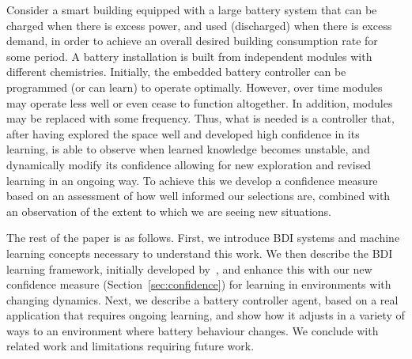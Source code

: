 Consider a smart building equipped with a large
battery system that can be charged when there is excess power, and
used (discharged) when there is excess demand, in order to
achieve an overall desired building consumption rate for some
period. A battery installation is built from independent modules with
different chemistries. Initially, the embedded battery controller can
be programmed (or can learn) to operate optimally. However, over time
modules may operate less well or even
cease to function altogether. In addition, modules may be replaced
with some frequency.   
Thus, what is needed is a controller that, after having explored
the space well and developed high confidence in its learning,
is able to observe when learned knowledge becomes unstable, and
dynamically modify its confidence allowing for new exploration and
revised learning in an ongoing way. To achieve this we develop a
confidence measure based on an assessment of how well informed our
selections are, combined with an observation of the extent to which we
are seeing new situations.

The rest of the paper is as follows.
%
First, we introduce BDI systems and machine learning
concepts necessary to understand this work.  
%
We then describe the BDI learning framework, initially developed
by~\cite{airiau09:enhancing,singh10:extending,singh10:learning}, and
enhance this with our new confidence measure (Section~\ref{sec:confidence})
for learning in environments with changing dynamics.  
%
Next, we describe a battery controller agent, based on a real
application that requires ongoing learning, and show how it adjusts in
a variety of ways to an environment where battery behaviour changes.  
%
We conclude with related work and limitations requiring future work.




